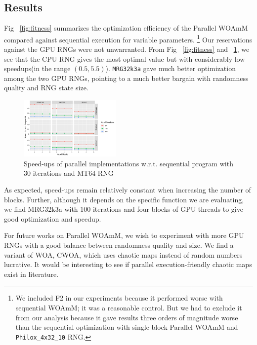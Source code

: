\documentclass[conference]{IEEEtran}
\begin{document}
\subsection{Results}

Fig ~\ref{fig:fitness} summarizes the optimization efficiency of the Parallel WOAmM compared against sequential execution for variable parameters. 
\footnote{We included F2 in our experiments because it performed worse with sequential WOAmM; it was a reasonable control. 
But we had to exclude it  from our analysis because it gave results three orders of magnitude worse than the sequential optimization with single block Parallel WOAmM and \lstinline{Philox_4x32_10} RNG.}
Our reservations against the GPU RNGs were not unwarranted. 
From Fig ~\ref{fig:fitness} and ~\ref{fig:speed}, we see that the CPU RNG gives the most optimal value but with considerably low speedups(in the range $(0.5,5.5)$). 
\lstinline{MRG32k3a} gave much better optimization among the two GPU RNGs, pointing to a much better bargain with randomness quality and RNG state size. 

\begin{figure}[ht]
\centering
\includegraphics[width=0.44\textwidth]{speed_up}
\caption{Speed-ups of parallel implementations w.r.t. sequential program with 30 iterations and MT64 RNG}
\label{fig:speed}
\end{figure}

As expected, speed-ups remain relatively constant when increasing the number of blocks. 
Further, although it depends on the specific function we are evaluating, we find MRG32k3a with 100 iterations and four blocks of GPU threads to give good optimization and speedup.

For future works on Parallel WOAmM, we wish to experiment with more GPU RNGs with a good balance between randomness quality and size.  
We find a variant of WOA, CWOA\cite{10.1016/j.jcde.2017.12.006}, which uses chaotic maps instead of random numbers lucrative. 
It would be interesting to see if parallel execution-friendly chaotic maps exist in literature.



\end{document}
